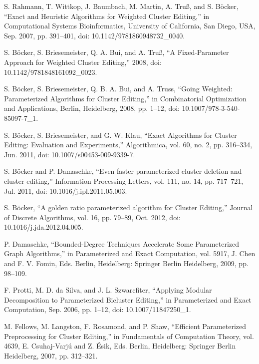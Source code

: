 \documentclass[12pt,oneside,english,parskip=full,headings=small]{scrbook}
\theoremstyle{definition}
\begin{document}
\begin{thebibliography}{99}
S. Rahmann, T. Wittkop, J. Baumbach, M. Martin, A. Truß, and S. Böcker, “Exact and Heuristic
Algorithms for Weighted Cluster Editing,” in Computational Systems Bioinformatics, University of
California, San Diego, USA, Sep. 2007, pp. 391–401, doi: 10.1142/9781860948732\_0040.

S. Böcker, S. Briesemeister, Q. A. Bui, and A. Truß, “A Fixed-Parameter Approach for Weighted
Cluster Editing,” 2008, doi: 10.1142/9781848161092\_0023.

S. Böcker, S. Briesemeister, Q. B. A. Bui, and A. Truss, “Going Weighted: Parameterized
Algorithms for Cluster Editing,” in Combinatorial Optimization and Applications, Berlin, Heidelberg,
2008, pp. 1–12, doi: 10.1007/978-3-540-85097-7\_1.

S. Böcker, S. Briesemeister, and G. W. Klau, “Exact Algorithms for Cluster Editing: Evaluation
and Experiments,” Algorithmica, vol. 60, no. 2, pp. 316–334, Jun. 2011, doi:
10.1007/s00453-009-9339-7.

S. Böcker and P. Damaschke, “Even faster parameterized cluster deletion and cluster editing,”
Information Processing Letters, vol. 111, no. 14, pp. 717–721, Jul. 2011, doi:
10.1016/j.ipl.2011.05.003.

S. Böcker, “A golden ratio parameterized algorithm for Cluster Editing,” Journal of Discrete
Algorithms, vol. 16, pp. 79–89, Oct. 2012, doi: 10.1016/j.jda.2012.04.005.

P. Damaschke, “Bounded-Degree Techniques Accelerate Some Parameterized Graph Algorithms,” in
Parameterized and Exact Computation, vol. 5917, J. Chen and F. V. Fomin, Eds. Berlin, Heidelberg:
Springer Berlin Heidelberg, 2009, pp. 98–109.

F. Protti, M. D. da Silva, and J. L. Szwarcfiter, “Applying Modular Decomposition to
Parameterized Bicluster Editing,” in Parameterized and Exact Computation, Sep. 2006, pp. 1–12, doi:
10.1007/11847250\_1.

M. Fellows, M. Langston, F. Rosamond, and P. Shaw, “Efficient Parameterized Preprocessing for
Cluster Editing,” in Fundamentals of Computation Theory, vol. 4639, E. Csuhaj-Varjú and Z. Ésik,
Eds. Berlin, Heidelberg: Springer Berlin Heidelberg, 2007, pp. 312–321.


\end{thebibliography}
\end{document}
